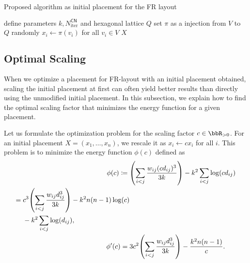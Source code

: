 \documentclass[dvipdfmx,10pt,journal,compsoc]{IEEEtran}
\newcommand{\defeq}{\coloneqq}
\begin{document}
\begin{algorithm}[h]
    \caption{Proposed algorithm as initial placement for the FR layout}
    \label{alg:proposed}

    define parameters $k, N_\mathrm{iter}^\mathsf{CN}$ and hexagonal lattice $Q$\;
    set $\pi$ as a injection from $V$ to $Q$ randomly\;
    $x_i \gets \pi(v_i)$ for all $v_i \in V$\;
        \Return $X$
\end{algorithm}

\subsection{Optimal Scaling}\label{ssec:scaling}

When we optimize a placement for FR-layout with an initial placement obtained, scaling the initial placement at first can often yield better results than directly using the unmodified initial placement.
In this subsection, we explain how to find the optimal scaling factor that minimizes the energy function for a given placement.

Let us formulate the optimization problem for the scaling factor $c \in \bbR_{> 0}$. For an initial placement $X = (x_1, \dots, x_n)$, we rescale it as $x_i \gets c x_i$ for all $i$.
This problem is to minimize the energy function $\phi(c)$ defined as
\begin{align*}
    \phi(c) \defeq {} & \qty(\sum_{i < j} \frac{w_{ij} (cd_{ij})^3}{3k}) - k^2 \sum_{i < j} \log(c d_{ij})                                   \\
    \begin{split}
        = {} & c^3 \qty(\sum_{i < j} \frac{w_{ij} d_{ij}^3}{3k}) - k^2 n(n-1)\log(c) \\
             & - k^2 \sum_{i < j} \log(d_{ij}),
    \end{split} \\
    \phi'(c) = {}     & 3c^2 \qty(\sum_{i < j} \frac{w_{ij} d_{ij}^3}{3k}) - \frac{k^2 n(n-1)}{c}.
\end{align*}
\end{document}
